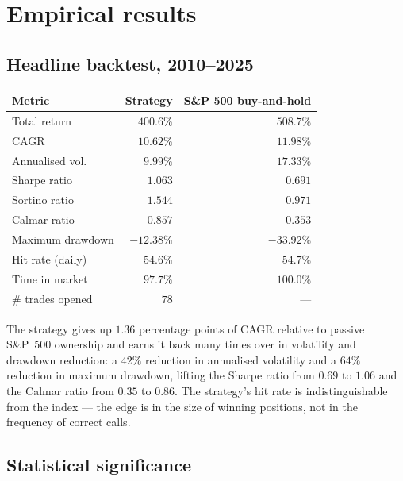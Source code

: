 \documentclass[11pt,a4paper]{article}
\begin{document}
\section{Empirical results}

\subsection{Headline backtest, 2010--2025}

\begin{center}
\begin{tabular}{@{}lrr@{}}
\toprule
Metric & Strategy & S\&P 500 buy-and-hold \\
\midrule
Total return         & $400.6\%$  & $508.7\%$ \\
CAGR                 & $10.62\%$ & $11.98\%$ \\
Annualised vol.\     & $9.99\%$  & $17.33\%$ \\
Sharpe ratio         & $1.063$   & $0.691$ \\
Sortino ratio        & $1.544$   & $0.971$ \\
Calmar ratio         & $0.857$   & $0.353$ \\
Maximum drawdown     & $-12.38\%$ & $-33.92\%$ \\
Hit rate (daily)     & $54.6\%$  & $54.7\%$ \\
Time in market       & $97.7\%$  & $100.0\%$ \\
\# trades opened     & $78$      & --- \\
\bottomrule
\end{tabular}
\end{center}

The strategy gives up $1.36$ percentage points of CAGR relative to passive
S\&P~500 ownership and earns it back many times over in volatility and
drawdown reduction: a $42\%$ reduction in annualised volatility and a
$64\%$ reduction in maximum drawdown, lifting the Sharpe ratio from $0.69$ to
$1.06$ and the Calmar ratio from $0.35$ to $0.86$. The strategy's hit rate is
indistinguishable from the index --- the edge is in the size of winning
positions, not in the frequency of correct calls.

\subsection{Statistical significance}
\end{document}
